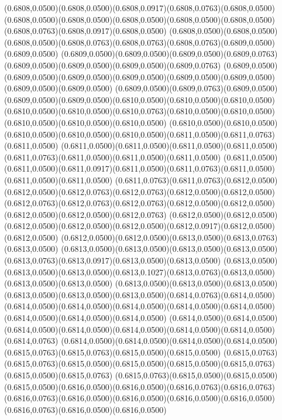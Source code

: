 (0.6808,0.0500)(0.6808,0.0500)(0.6808,0.0917)(0.6808,0.0763)(0.6808,0.0500)
\PST@Solid(0.6808,0.0500)(0.6808,0.0500)(0.6808,0.0500)(0.6808,0.0500)(0.6808,0.0500)(0.6808,0.0763)(0.6808,0.0917)(0.6808,0.0500)
(0.6808,0.0500)(0.6808,0.0500)(0.6808,0.0500)(0.6808,0.0763)(0.6808,0.0763)(0.6808,0.0763)(0.6809,0.0500)(0.6809,0.0500)
(0.6809,0.0500)(0.6809,0.0500)(0.6809,0.0500)(0.6809,0.0763)(0.6809,0.0500)(0.6809,0.0500)(0.6809,0.0500)(0.6809,0.0763)
(0.6809,0.0500)(0.6809,0.0500)(0.6809,0.0500)(0.6809,0.0500)(0.6809,0.0500)(0.6809,0.0500)(0.6809,0.0500)(0.6809,0.0500)
(0.6809,0.0500)(0.6809,0.0763)(0.6809,0.0500)(0.6809,0.0500)(0.6809,0.0500)(0.6810,0.0500)(0.6810,0.0500)(0.6810,0.0500)
(0.6810,0.0500)(0.6810,0.0500)(0.6810,0.0763)(0.6810,0.0500)(0.6810,0.0500)(0.6810,0.0500)(0.6810,0.0500)(0.6810,0.0500)
(0.6810,0.0500)(0.6810,0.0500)(0.6810,0.0500)(0.6810,0.0500)(0.6810,0.0500)(0.6811,0.0500)(0.6811,0.0763)(0.6811,0.0500)
(0.6811,0.0500)(0.6811,0.0500)(0.6811,0.0500)(0.6811,0.0500)(0.6811,0.0763)(0.6811,0.0500)(0.6811,0.0500)(0.6811,0.0500)
(0.6811,0.0500)(0.6811,0.0500)(0.6811,0.0917)(0.6811,0.0500)(0.6811,0.0763)(0.6811,0.0500)(0.6811,0.0500)(0.6811,0.0500)
(0.6811,0.0763)(0.6811,0.0763)(0.6812,0.0500)(0.6812,0.0500)(0.6812,0.0763)(0.6812,0.0763)(0.6812,0.0500)(0.6812,0.0500)
(0.6812,0.0763)(0.6812,0.0763)(0.6812,0.0763)(0.6812,0.0500)(0.6812,0.0500)(0.6812,0.0500)(0.6812,0.0500)(0.6812,0.0763)
(0.6812,0.0500)(0.6812,0.0500)(0.6812,0.0500)(0.6812,0.0500)(0.6812,0.0500)(0.6812,0.0917)(0.6812,0.0500)(0.6812,0.0500)
(0.6812,0.0500)(0.6812,0.0500)(0.6813,0.0500)(0.6813,0.0763)(0.6813,0.0500)
\PST@Solid(0.6813,0.0500)(0.6813,0.0500)(0.6813,0.0500)(0.6813,0.0500)(0.6813,0.0763)(0.6813,0.0917)(0.6813,0.0500)(0.6813,0.0500)
(0.6813,0.0500)(0.6813,0.0500)(0.6813,0.0500)(0.6813,0.1027)(0.6813,0.0763)(0.6813,0.0500)(0.6813,0.0500)(0.6813,0.0500)
(0.6813,0.0500)(0.6813,0.0500)(0.6813,0.0500)(0.6813,0.0500)(0.6813,0.0500)(0.6813,0.0500)(0.6814,0.0763)(0.6814,0.0500)
(0.6814,0.0500)(0.6814,0.0500)(0.6814,0.0500)(0.6814,0.0500)(0.6814,0.0500)(0.6814,0.0500)(0.6814,0.0500)(0.6814,0.0500)
(0.6814,0.0500)(0.6814,0.0500)(0.6814,0.0500)(0.6814,0.0500)(0.6814,0.0500)(0.6814,0.0500)(0.6814,0.0500)(0.6814,0.0763)
(0.6814,0.0500)(0.6814,0.0500)(0.6814,0.0500)(0.6814,0.0500)(0.6815,0.0763)(0.6815,0.0763)(0.6815,0.0500)(0.6815,0.0500)
(0.6815,0.0763)(0.6815,0.0763)(0.6815,0.0500)(0.6815,0.0500)(0.6815,0.0500)(0.6815,0.0763)(0.6815,0.0500)(0.6815,0.0763)
(0.6815,0.0763)(0.6815,0.0500)(0.6815,0.0500)(0.6815,0.0500)(0.6816,0.0500)(0.6816,0.0500)(0.6816,0.0763)(0.6816,0.0763)
(0.6816,0.0763)(0.6816,0.0500)(0.6816,0.0500)(0.6816,0.0500)(0.6816,0.0500)(0.6816,0.0763)(0.6816,0.0500)(0.6816,0.0500)
